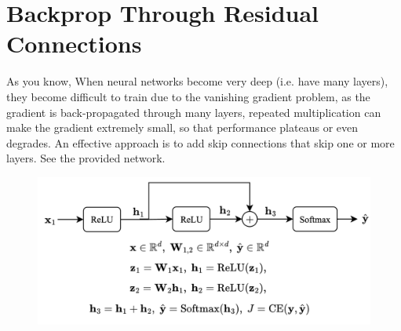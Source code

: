 \section{Backprop Through Residual Connections}  
    As you know, When neural networks become very deep (i.e. have many layers), they become difficult to train due to the vanishing gradient problem, as the gradient is back-propagated through many layers, repeated multiplication can make the gradient extremely small, so that performance plateaus or even degrades.
    An effective approach is to add skip connections that skip one or more layers. See the provided network. 

    \begin{figure}[ht]
        \centering
        \includegraphics[scale=0.47]{figures/small-restnes.png}
    \end{figure}

